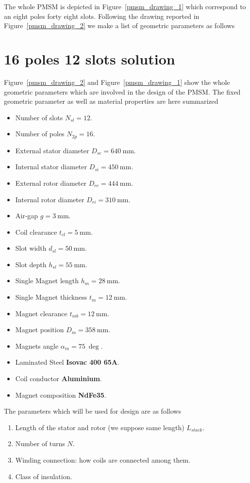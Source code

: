 \documentclass[12pt,a4paper,oneside]{book}
\begin{document}
\begin{onehalfspace}
The whole PMSM is depicted in Figure~\ref{pmsm_drawing_1} which correspond to an eight poles forty eight slots.
Following the drawing reported in Figure~\ref{pmsm_drawing_2} we make a list of geometric parameters as follows


\section{16 poles 12 slots solution}
Figure~\ref{pmsm_drawing_2} and Figure~\ref{pmsm_drawing_1} show the whole geometric parameters which are involved in the design of the PMSM. The fixed geometric parameter as well as material properties are here summarized
\begin{itemize}
	\item Number of slots $N_{sl}=12$.	
	\item Number of poles $N_{2p}=16$.
	\item External stator diameter $D_{se}=\SI{640}{\milli\meter}$.
	\item Internal stator diameter $D_{si}=\SI{450}{\milli\meter}$.
	\item External rotor diameter $D_{re}=\SI{444}{\milli\meter}$.
	\item Internal rotor diameter $D_{ri}=\SI{310}{\milli\meter}$.
	\item Air-gap $g=\SI{3}{\milli\meter}$.
	\item Coil clearance $t_{cl}=\SI{5}{\milli\meter}$.
	\item Slot width $d_{sl}=\SI{50}{\milli\meter}$.
	\item Slot depth $h_{sl}=\SI{55}{\milli\meter}$.
	\item Single Magnet length $h_{m}=\SI{28}{\milli\meter}$.
	\item Single Magnet thickness $t_{m}=\SI{12}{\milli\meter}$.
	\item Magnet clearance $t_{mb}=\SI{12}{\milli\meter}$.
	\item Magnet position $D_{m}=\SI{358}{\milli\meter}$.
	\item Magnets angle $\alpha_{m}=\SI{75}{\deg}$.
	\item Laminated Steel \textbf{Isovac 400 65A}.
	\item Coil conductor \textbf{Aluminium}.
	\item Magnet composition \textbf{NdFe35}.
\end{itemize}
The parameters which will be used for design are as follows
\begin{enumerate}
	\item Length of the stator and rotor (we suppose same length) $L_{stack}$.
	\item Number of turns $N$.
	\item Winding connection: how coils are connected among them.
	\item Class of insulation.
\end{enumerate}



\end{onehalfspace}
\end{document}
